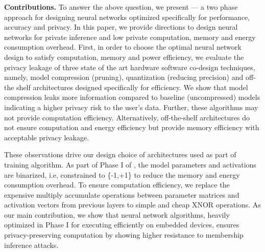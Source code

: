 \noindent\textbf{Contributions.} To answer the above question, we present \method ---  a two phase approach for designing neural networks optimized specifically for performance, accuracy and privacy.
In this paper, we provide directions to design neural networks for private inference and low private computation, memory and energy consumption overhead.
First, in order to choose the optimal neural network design to satisfy computation, memory and power efficiency, we evaluate the privacy leakage of three state of the art hardware software co-design techniques, namely, model compression (pruning), quantization (reducing precision) and off-the shelf architectures designed specifically for efficiency.
We show that model compression leaks more information compared to baseline (uncompressed) models indicating a higher privacy risk to the user's data.
Further, these algorithms may not provide computation efficiency.
Alternatively, off-the-shelf architectures do not ensure computation and energy efficiency but provide memory efficiency with acceptable privacy leakage.

These observations drive our design choice of architectures used as part of \method\hspace{0.02in} training algorithm.
As part of Phase I of \method, the model parameters and activations are binarized, i.e, constrained to \{-1,+1\} to reduce the memory and energy consumption overhead.
To ensure computation efficiency, we replace the expensive multiply accumulate operations between parameter matrices and activation vectors from previous layers to simple and cheap XNOR operations.
As our main contribution, we show that neural network algorithms, heavily optimized in Phase I for executing efficiently on embedded devices, ensures privacy-preserving computation by showing higher resistance to membership inference attacks.

